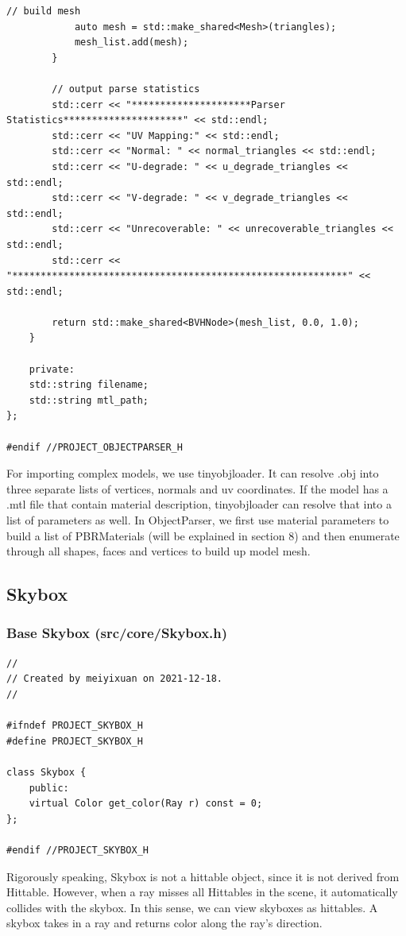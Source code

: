 \documentclass[utf8]{article}
\begin{document}
\begin{lstlisting}[style=CStyle]
			// build mesh
			auto mesh = std::make_shared<Mesh>(triangles);
			mesh_list.add(mesh);
		}
		
		// output parse statistics
		std::cerr << "*********************Parser Statistics*********************" << std::endl;
		std::cerr << "UV Mapping:" << std::endl;
		std::cerr << "Normal: " << normal_triangles << std::endl;
		std::cerr << "U-degrade: " << u_degrade_triangles << std::endl;
		std::cerr << "V-degrade: " << v_degrade_triangles << std::endl;
		std::cerr << "Unrecoverable: " << unrecoverable_triangles << std::endl;
		std::cerr << "***********************************************************" << std::endl;
		
		return std::make_shared<BVHNode>(mesh_list, 0.0, 1.0);
	}
	
	private:
	std::string filename;
	std::string mtl_path;
};

#endif //PROJECT_OBJECTPARSER_H

\end{lstlisting}
For importing complex models, we use tinyobjloader. It can resolve .obj into three separate lists of vertices, normals and uv coordinates. If the model has a .mtl file that contain material description, tinyobjloader can resolve that into a list of parameters as well. In ObjectParser, we first use material parameters to build a list of PBRMaterials (will be explained in section 8) and then enumerate through all shapes, faces and vertices to build up model mesh.

\subsection{Skybox}
\subsubsection{Base Skybox (src/core/Skybox.h)}
\begin{lstlisting}[style=CStyle]
//
// Created by meiyixuan on 2021-12-18.
//

#ifndef PROJECT_SKYBOX_H
#define PROJECT_SKYBOX_H

class Skybox {
	public:
	virtual Color get_color(Ray r) const = 0;
};

#endif //PROJECT_SKYBOX_H

\end{lstlisting}
Rigorously speaking, Skybox is not a hittable object, since it is not derived from Hittable. However, when a ray misses all Hittables in the scene, it automatically collides with the skybox. In this sense, we can view skyboxes as hittables. A skybox takes in a ray and returns color along the ray's direction.
\end{document}
